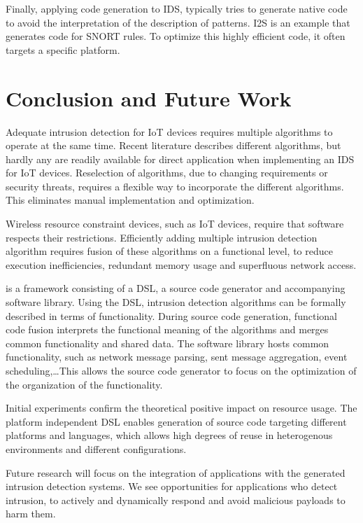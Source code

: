 \documentclass[conference]{IEEEtran}
\begin{document}
Finally, applying code generation to IDS, typically tries to generate native
code to avoid the interpretation of the description of patterns.
I2S \cite{charitakis2003code} is an example that generates code for
SNORT \cite{roesch1999snort} rules. To optimize this highly efficient code, it
often targets a specific platform.

\section{Conclusion and Future Work}
\label{conclusion}

Adequate intrusion detection for IoT devices requires multiple algorithms to
operate at the same time. Recent literature describes different algorithms, but
hardly any are readily available for direct application when implementing an
IDS for IoT devices. Reselection of algorithms, due to changing requirements or
security threats, requires a flexible way to incorporate the different
algorithms. This eliminates manual implementation and optimization.

Wireless resource constraint devices, such as IoT devices, require that
software respects their restrictions. Efficiently adding multiple intrusion
detection algorithm requires fusion of these algorithms on a functional level,
to reduce execution inefficiencies, redundant memory usage and superfluous
network access.

\NAME is a framework consisting of a DSL, a source code generator and
accompanying software library. Using the DSL, intrusion detection algorithms
can be formally described in terms of functionality. During source code
generation, functional code fusion interprets the functional meaning of the
algorithms and merges common functionality and shared data. The software
library hosts common functionality, such as network message parsing, sent
message aggregation, event scheduling,\dots This allows the source code
generator to focus on the optimization of the organization of the functionality.

Initial experiments confirm the theoretical positive impact on resource usage.
The platform independent DSL enables generation of source code targeting
different platforms and languages, which allows high degrees of reuse in
heterogenous environments and different configurations.

Future research will focus on the integration of applications with the
generated intrusion detection systems. We see opportunities for applications
who detect intrusion, to actively and dynamically respond and avoid malicious
payloads to harm them.
\end{document}
